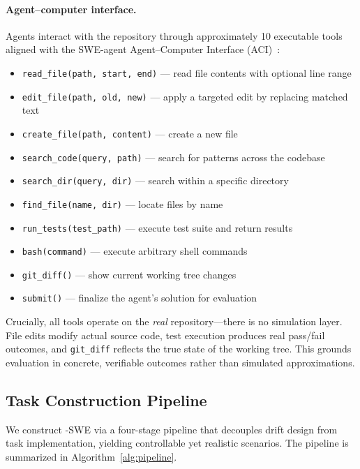\paragraph{Agent--computer interface.}
Agents interact with the repository through approximately 10 executable tools aligned with the SWE-agent Agent--Computer Interface (ACI)~\citep{yang2024sweagent}:

\begin{itemize}[leftmargin=1.5em, itemsep=1pt]
    \item \texttt{read\_file(path, start, end)} --- read file contents with optional line range
    \item \texttt{edit\_file(path, old, new)} --- apply a targeted edit by replacing matched text
    \item \texttt{create\_file(path, content)} --- create a new file
    \item \texttt{search\_code(query, path)} --- search for patterns across the codebase
    \item \texttt{search\_dir(query, dir)} --- search within a specific directory
    \item \texttt{find\_file(name, dir)} --- locate files by name
    \item \texttt{run\_tests(test\_path)} --- execute test suite and return results
    \item \texttt{bash(command)} --- execute arbitrary shell commands
    \item \texttt{git\_diff()} --- show current working tree changes
    \item \texttt{submit()} --- finalize the agent's solution for evaluation
\end{itemize}

\noindent Crucially, all tools operate on the \emph{real} repository---there is no simulation layer. File edits modify actual source code, test execution produces real pass/fail outcomes, and \texttt{git\_diff} reflects the true state of the working tree. This grounds evaluation in concrete, verifiable outcomes rather than simulated approximations.

\subsection{Task Construction Pipeline}
\label{sec:bench-pipeline}

We construct \bench{}-SWE via a four-stage pipeline that decouples drift design from task implementation, yielding controllable yet realistic scenarios. The pipeline is summarized in Algorithm~\ref{alg:pipeline}.

